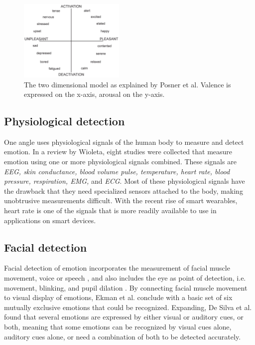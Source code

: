 \documentclass{sigchi}
\begin{document}
\begin{figure}[h]
    \centering
    \includegraphics[width=0.45\textwidth]{images/CircumplexModel.jpg}
    \caption{The two dimensional model as explained by Posner et al. Valence is expressed on the x-axis, arousal on the y-axis.}
    \label{fig:circumplex_model}
\end{figure}

\subsection{Physiological detection} %
\label{sub:physiology}
One angle uses physiological signals of the human body to measure and detect emotion. In a review by Wioleta\cite{Wioleta2013}, eight studies were collected that measure emotion using one or more physiological signals combined. These signals are \textit{EEG, skin conductance, blood volume pulse, temperature, heart rate, blood pressure, respiration, EMG,} and \textit{ECG}. Most of these physiological signals have the drawback that they need specialized sensors attached to the body, making unobtrusive measurements difficult. With the recent rise of smart wearables, heart rate is one of the signals that is more readily available to use in applications on smart devices.

\subsection{Facial detection} %
\label{sub:facial_detection}
Facial detection of emotion incorporates the measurement of facial muscle movement, voice or speech \cite{Ververidis2004}, and also includes the eye as point of detection, i.e. movement, blinking, and pupil dilation \cite{Soleymani2015}. By connecting facial muscle movement to visual display of emotions, Ekman et al. \cite{Ekman1969} conclude with a basic set of six mutually exclusive emotions that could be recognized. Expanding, De Silva et al. \cite{Silva1997} found that several emotions are expressed by either visual or auditory cues, or both, meaning that some emotions can be recognized by visual cues alone, auditory cues alone, or need a combination of both to be detected accurately.
\end{document}
